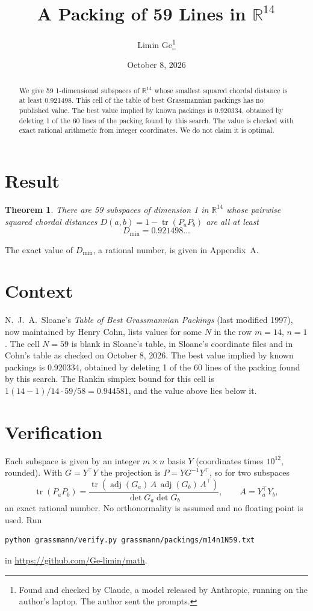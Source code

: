 \documentclass[11pt,a4paper]{article}
\title{A Packing of 59 Lines in $\mathbb{R}^{14}$}
\author{Limin Ge\thanks{Found and checked by Claude, a model released by Anthropic, running on the author's laptop. The author sent the prompts.}}
\date{October 8, 2026}
\newtheorem*{theorem}{Theorem}
\begin{document}
\maketitle
\begin{abstract}
We give 59 1-dimensional subspaces of $\mathbb{R}^{14}$ whose smallest squared chordal distance is at least 0.921498. This cell of the table of best Grassmannian packings has no published value. The best value implied by known packings is 0.920334, obtained by deleting 1 of the 60 lines of the packing found by this search. The value is checked with exact rational arithmetic from integer coordinates. We do not claim it is optimal.
\end{abstract}

\section{Result}
\begin{theorem}
There are 59 subspaces of dimension 1 in $\mathbb{R}^{14}$ whose pairwise squared chordal distances $D(a,b) = 1 - \operatorname{tr}(P_aP_b)$ are all at least
\[ D_{\min} = 0.921498\ldots \]
\end{theorem}
The exact value of $D_{\min}$, a rational number, is given in Appendix~A.


\section{Context}
N.~J.~A.~Sloane's \emph{Table of Best Grassmannian Packings} (last modified 1997), now maintained by Henry Cohn, lists values for some $N$ in the row $m=14$, $n=1$. The cell $N=59$ is blank in Sloane's table, in Sloane's coordinate files and in Cohn's table as checked on October 8, 2026. The best value implied by known packings is 0.920334, obtained by deleting 1 of the 60 lines of the packing found by this search. The Rankin simplex bound for this cell is $1(14-1)/14\cdot 59/58 = 0.944581$, and the value above lies below it.


\section{Verification}
Each subspace is given by an integer $m\times n$ basis $Y$ (coordinates times $10^{12}$, rounded). With $G=Y^\top Y$ the projection is $P=YG^{-1}Y^\top$, so for two subspaces
\[ \operatorname{tr}(P_aP_b)=\frac{\operatorname{tr}(\operatorname{adj}(G_a)\,A\,\operatorname{adj}(G_b)\,A^\top)}{\det G_a\det G_b},\qquad A=Y_a^\top Y_b, \]
an exact rational number. No orthonormality is assumed and no floating point is used. Run
\begin{verbatim}
python grassmann/verify.py grassmann/packings/m14n1N59.txt
\end{verbatim}
in \url{https://github.com/Ge-limin/math}.
\end{document}
